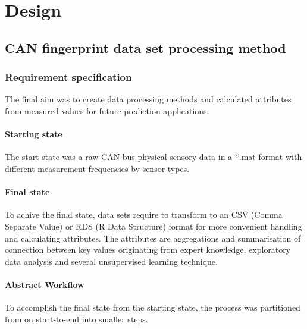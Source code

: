 \chapter{Design}
\section{CAN fingerprint data set processing method}
\subsection{Requirement specification}
	\noindent
The final aim was to create data processing methods and calculated attributes from measured values for future prediction applications.
	\subsubsection{Starting state}
The start state was a raw CAN bus physical sensory data in a *.mat format with different measurement frequencies by sensor types.
	\subsubsection{Final state}
		\noindent
To achive the final state, data sets require to transform to an CSV (Comma Separate Value) or RDS (R Data Structure) format for more convenient handling and calculating attributes.
		\noindent
The attributes are aggregations and summarisation of connection between key values originating from expert knowledge, exploratory data analysis and several unsupervised learning technique.
\subsubsection{Abstract Workflow}
To accomplish the final state from the starting state, the process was partitioned from on start-to-end into smaller steps. 

